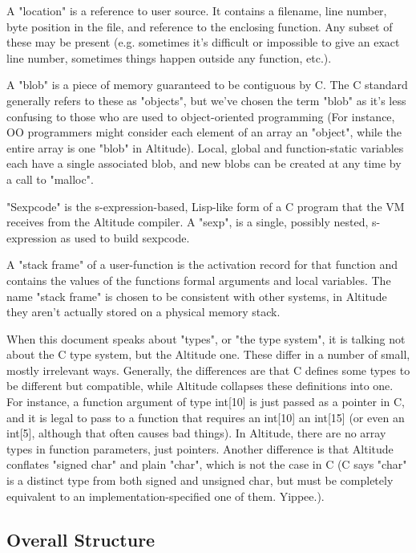 \documentclass[10pt,a4paper]{report}
\begin{document}
A "location" is a reference to user source. It contains a filename, line number, byte position in the file, and reference to the enclosing function. Any subset of these may be present (e.g. sometimes it's difficult or impossible to give an exact line number, sometimes things happen outside any function, etc.).

A "blob" is a piece of memory guaranteed to be contiguous by C. The C standard generally refers to these as "objects", but we've chosen the term "blob" as it's less confusing to those who are used to object-oriented programming (For instance, OO programmers might consider each element of an array an "object", while the entire array is one "blob" in Altitude). Local, global and function-static variables each have a single associated blob, and new blobs can be created at any time by a call to "malloc".

"Sexpcode" is the s-expression-based, Lisp-like form of a C program that the VM receives from the Altitude compiler. A "sexp", is a single, possibly nested, s-expression as used to build sexpcode.

A "stack frame" of a user-function is the activation record for that function and contains the values of the functions formal arguments and local variables. The name "stack frame" is chosen to be consistent with other systems, in Altitude they aren't actually stored on a physical memory stack.

When this document speaks about "types", or "the type system", it is talking not about the C type system, but the Altitude one. These differ in a number of small, mostly irrelevant ways. Generally, the differences are that C defines some types to be different but compatible, while Altitude collapses these definitions into one. For instance, a function argument of type int[10] is just passed as a pointer in C, and it is legal to pass to a function that requires an int[10] an int[15] (or even an int[5], although that often causes bad things). In Altitude, there are no array types in function parameters, just pointers. Another difference is that Altitude conflates "signed char" and plain "char", which is not the case in C (C says "char" is a distinct type from both signed and unsigned char, but must be completely equivalent to an implementation-specified one of them. Yippee.).


\subsection{Overall Structure}
\end{document}
